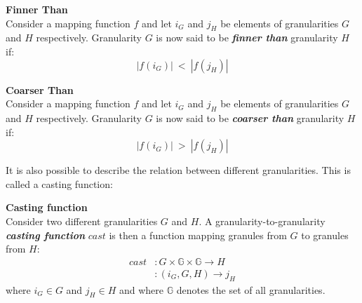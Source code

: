 \begin{svgraybox}
\vspace{-10pt}
\begin{definition}\textbf{Finner Than}~\cite{Lin97}\\
Consider a mapping function $f$ and let $i_G$ and $j_H$ be elements of granularities $G$ and $H$ respectively. Granularity $G$ is now said to be \emph{\textbf{finner than}} granularity $H$ if:
\begin{equation}
\label{eq:finner-than}
| f \left( i_G \right) |\ <\ |  f \left( j_H \right)| \nonumber
\end{equation} 
\end{definition}

\begin{definition}
\label{def:coarser-than}\textbf{Coarser Than}~\cite{Lin97}\\
Consider a mapping function $f$ and let $i_G$ and $j_H$ be elements of granularities $G$ and $H$ respectively. Granularity $G$ is now said to be \emph{\textbf{coarser than}} granularity $H$ if:
\begin{equation}
\label{eq:coarser-than}
| f \left( i_G \right)|\ >\ |  f \left( j_H \right)| \nonumber
\end{equation} 
\end{definition}
\vspace{-10pt}
\end{svgraybox}

It is also possible to describe the relation between different granularities. This is called a casting function:
\begin{svgraybox}
\vspace{-10pt}
\begin{definition}
\textbf{Casting function}~\cite{Lin97}\\
\label{def:casting-fucntion}
Consider two different granularities $G$ and $H$. A granularity-to-granularity \emph{\textbf{casting function}} $cast$ is then a function mapping granules from $G$ to granules from $H$: 
\begin{align}
\label{eq:cast-function}
cast & : G \times \mathbb{G} \times \mathbb{G} \rightarrow H \nonumber\\
		 & : (i_{G}, G, H) \rightarrow j_{H} \nonumber
\end{align}
where $i_{G} \in G$ and $j_{H} \in H$ and where $\mathbb{G}$ denotes the set of all granularities.
\end{definition}
\vspace{-10pt}
\end{svgraybox}

